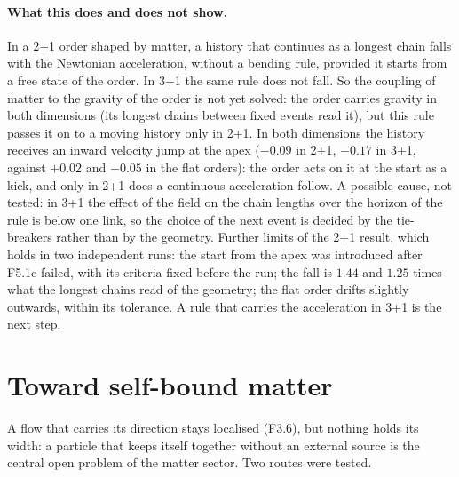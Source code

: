 \paragraph{What this does and does not show.} In a 2+1 order shaped by matter, a history that continues as a
longest chain falls with the Newtonian acceleration, without a bending rule, provided it starts from a
free state of the order. In 3+1 the same rule does not fall. So the coupling of matter to the gravity of
the order is not yet solved: the order carries gravity in both dimensions (its longest chains between fixed
events read it), but this rule passes it on to a moving history only in 2+1. In both dimensions the history
receives an inward velocity jump at the apex ($-0.09$ in 2+1, $-0.17$ in 3+1, against $+0.02$ and $-0.05$ in
the flat orders): the order acts on it at the start as a kick, and only in 2+1 does a continuous acceleration
follow. A possible cause, not tested: in 3+1 the effect of the field on the chain lengths over the horizon of
the rule is below one link, so the choice of the next event is decided by the tie-breakers rather than by the
geometry. Further limits of the 2+1 result, which holds in two independent runs: the start from the apex was
introduced after F5.1c failed, with its criteria fixed before the run; the fall is $1.44$ and $1.25$ times what
the longest chains read of the geometry; the flat order drifts slightly outwards, within its tolerance. A rule
that carries the acceleration in 3+1 is the next step.

\section{Toward self-bound matter}\label{sec:matter}

A flow that carries its direction stays localised (F3.6), but nothing holds its width: a particle that keeps
itself together without an external source is the central open problem of the matter sector. Two routes were
tested.

